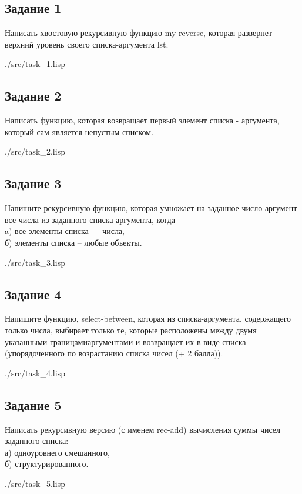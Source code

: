 \subsection*{Задание 1}
Написать хвостовую рекурсивную функцию my-reverse, которая развернет верхний уровень своего списка-аргумента lst.

\begin{lstinputlisting}[
	label={lst:t1},
	style={lsp},
	]{./src/task_1.lisp}
\end{lstinputlisting}

\subsection*{Задание 2}

Написать функцию, которая возвращает первый элемент списка - аргумента, который сам
является непустым списком.

\begin{lstinputlisting}[
	label={lst:t2},
	style={lsp},
	]{./src/task_2.lisp}
\end{lstinputlisting}

\subsection*{Задание 3}

Напишите рекурсивную функцию, которая умножает на заданное число-аргумент все
числа из заданного списка-аргумента, когда \\
a) все элементы списка --- числа, \\
б) элементы списка -- любые объекты.

\begin{lstinputlisting}[
	label={lst:t3},
	style={lsp},
	]{./src/task_3.lisp}
\end{lstinputlisting}

\subsection*{Задание 4}

Напишите функцию, select-between, которая из списка-аргумента, содержащего только
числа, выбирает только те, которые расположены между двумя указанными границамиаргументами и возвращает их в виде списка (упорядоченного по возрастанию списка чисел
(+ 2 балла)).

\begin{lstinputlisting}[
	label={lst:t4},
	style={lsp},
	]{./src/task_4.lisp}
\end{lstinputlisting}

\subsection*{Задание 5}

Написать рекурсивную версию (с именем rec-add) вычисления суммы чисел заданного
списка: \\
а) одноуровнего смешанного, \\
б) структурированного.

\begin{lstinputlisting}[
	label={lst:t5},
	style={lsp},
	]{./src/task_5.lisp}
\end{lstinputlisting}